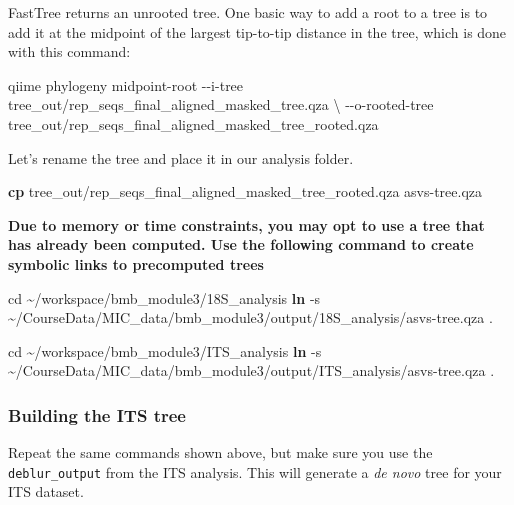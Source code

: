 \documentclass[
]{book}
\newenvironment{Shaded}{\begin{snugshade}}{\end{snugshade}}
\newcommand{\AttributeTok}[1]{\textcolor[rgb]{0.13,0.29,0.53}{#1}}
\newcommand{\BuiltInTok}[1]{#1}
\newcommand{\DataTypeTok}[1]{\textcolor[rgb]{0.13,0.29,0.53}{#1}}
\newcommand{\ExtensionTok}[1]{#1}
\newcommand{\FunctionTok}[1]{\textcolor[rgb]{0.13,0.29,0.53}{\textbf{#1}}}
\newcommand{\NormalTok}[1]{#1}
\begin{document}
FastTree returns an unrooted tree. One basic way to add a root to a tree is to add it at the midpoint of the largest tip-to-tip distance in the tree, which is done with this command:

\begin{Shaded}
\begin{Highlighting}[]
\ExtensionTok{qiime}\NormalTok{ phylogeny midpoint{-}root }\AttributeTok{{-}{-}i{-}tree}\NormalTok{ tree\_out/rep\_seqs\_final\_aligned\_masked\_tree.qza }\DataTypeTok{\textbackslash{}}
                              \AttributeTok{{-}{-}o{-}rooted{-}tree}\NormalTok{ tree\_out/rep\_seqs\_final\_aligned\_masked\_tree\_rooted.qza}
\end{Highlighting}
\end{Shaded}

Let's rename the tree and place it in our analysis folder.

\begin{Shaded}
\begin{Highlighting}[]
\FunctionTok{cp}\NormalTok{ tree\_out/rep\_seqs\_final\_aligned\_masked\_tree\_rooted.qza asvs{-}tree.qza}
\end{Highlighting}
\end{Shaded}

\textbf{Due to memory or time constraints, you may opt to use a tree that has already been computed. Use the following command to create symbolic links to precomputed trees}

\begin{Shaded}
\begin{Highlighting}[]
\BuiltInTok{cd}\NormalTok{ \textasciitilde{}/workspace/bmb\_module3/18S\_analysis}
\FunctionTok{ln} \AttributeTok{{-}s}\NormalTok{ \textasciitilde{}/CourseData/MIC\_data/bmb\_module3/output/18S\_analysis/asvs{-}tree.qza .}

\BuiltInTok{cd}\NormalTok{ \textasciitilde{}/workspace/bmb\_module3/ITS\_analysis}
\FunctionTok{ln} \AttributeTok{{-}s}\NormalTok{ \textasciitilde{}/CourseData/MIC\_data/bmb\_module3/output/ITS\_analysis/asvs{-}tree.qza .}
\end{Highlighting}
\end{Shaded}

\subsubsection{Building the ITS tree}\label{building-the-its-tree}

Repeat the same commands shown above, but make sure you use the \texttt{deblur\_output} from the ITS analysis. This will generate a \emph{de novo} tree for your ITS dataset.
\end{document}
